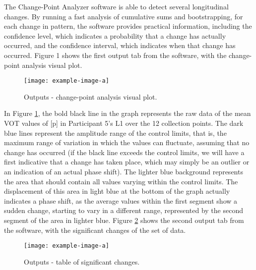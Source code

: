 The Change-Point Analyzer software is able to detect several longitudinal
changes. By running a fast analysis of cumulative sums and bootstrapping, for
each change in pattern, the software provides practical information, including
the confidence level, which indicates a probability that a change has actually
occurred, and the confidence interval, which indicates when that change has
occurred. Figure 1 shows the first output tab from the software, with the
change-point analysis visual plot.

\begin{figure}[h]
\centering
\texttt{[image: example-image-a]}
\caption{Outputs - change-point analysis visual plot.} 
\label{laura-fig01}
\end{figure}

In Figure \ref{laura-fig01}, the bold black line in the graph represents the raw data of the
mean VOT values of [p] in Participant 5’s L1 over the 12 collection points. The
dark blue lines represent the amplitude range of the control limits, that is,
the maximum range of variation in which the values can fluctuate, assuming that
no change has occurred (if the black line exceeds the control limits, we will
have a first indicative that a change has taken place, which may simply be an
outlier or an indication of an actual phase shift). The lighter blue background
represents the area that should contain all values varying within the control
limits. The displacement of this area in light blue at the bottom of the graph
actually indicates a phase shift, as the average values within the first
segment show a sudden change, starting to vary in a different range,
represented by the second segment of the area in lighter blue. Figure \ref{laura-fig02} shows
the second output tab from the software, with the significant changes of the
set of data.

\begin{figure}[h]
\centering
\texttt{[image: example-image-a]}
\caption{Outputs - table of significant changes.} 
\label{laura-fig02}
\end{figure}

